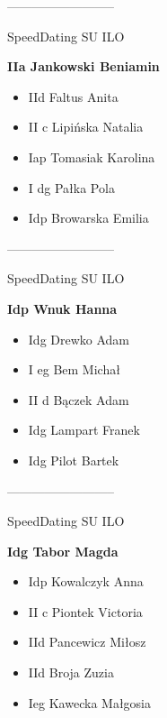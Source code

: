 \documentclass[a4paper,10pt]{article}
\begin{document}
\begin{multicols}{3}
\begin{minipage}[l]{\textwidth}
\end{minipage}



\begin{minipage}[l]{\textwidth}
--------------------------

  \footnotesize{SpeedDating SU ILO}

  \bfseries{IIa Jankowski Beniamin}

  \begin{itemize}
    \item IId Faltus Anita
    \item II c Lipińska Natalia
    \item Iap Tomasiak Karolina
    \item I dg Pałka Pola
    \item Idp Browarska Emilia

    \end{itemize}



\end{minipage}



\begin{minipage}[l]{\textwidth}
--------------------------

  \footnotesize{SpeedDating SU ILO}

  \bfseries{Idp Wnuk Hanna}

  \begin{itemize}
    \item Idg Drewko Adam
    \item I eg Bem Michał
    \item II d Bączek Adam
    \item Idg Lampart Franek
    \item Idg Pilot Bartek

    \end{itemize}



\end{minipage}



\begin{minipage}[l]{\textwidth}
--------------------------

  \footnotesize{SpeedDating SU ILO}

  \bfseries{Idg Tabor Magda}

  \begin{itemize}
    \item Idp Kowalczyk Anna
    \item II c Piontek Victoria
    \item IId Pancewicz Miłosz
    \item IId Broja Zuzia
    \item Ieg Kawecka Małgosia


\end{itemize}
\end{minipage}
\end{multicols}
\end{document}
